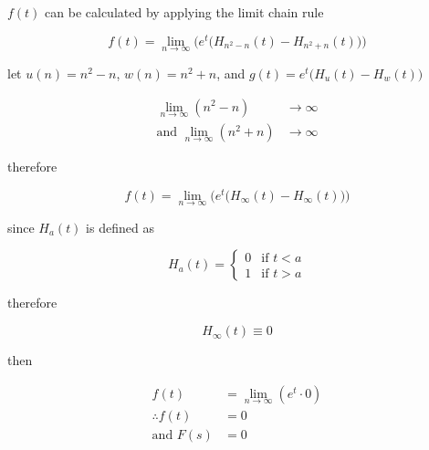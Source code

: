 \documentclass[a4paper,10pt,reqno]{amsart}
\numberwithin{equation}{section}
\begin{document}
$f(t)$ can be calculated by applying the limit chain rule

\begin{equation}
     f(t) = \lim_{n \to \infty} \bigg(e^t\big(H_{n^2 - n}(t) - H_{n^2 + n}(t)\big)\bigg)
\end{equation}
\vspace{1pt}

let $u(n) = n^2 - n$, $w(n) = n^2 + n$, and $g(t) = e^t\big(H_u(t) - H_w(t)\big)$

\begin{subequations}
     \begin{align}
         \lim_{n \to \infty} (n^2 - n) &\to \infty \\
         \text{and } \lim_{n \to \infty} (n^2 + n) &\to \infty 
     \end{align}  
\end{subequations}
\vspace{1pt}

therefore

\begin{equation}
     f(t) = \lim_{n \to \infty} \bigg(e^t\big(H_{\infty}(t) - H_{\infty}(t)\big)\bigg)
\end{equation}
\vspace{1pt}

since $H_a(t)$ is defined as

\begin{equation}
    H_a(t) = 
     \begin{cases}
         0 & \text{if } t < a \\
         1 & \text{if } t > a
     \end{cases}
\end{equation}
\vspace{1pt}

therefore

\begin{equation}
     H_{\infty}(t) \equiv 0
\end{equation}

then

\begin{subequations}
     \begin{align}
          f(t) &= \lim_{n \to \infty} (e^t \cdot 0) \\
          \therefore f(t) &= 0 \\
          \text{and } F(s) &= 0 \label{eq:F}
     \end{align}
\end{subequations}
\vspace{1pt}
\end{document}
